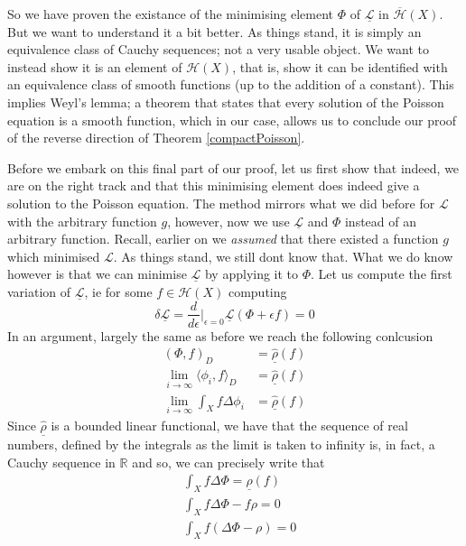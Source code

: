 \documentclass[11pt]{report}
\theoremstyle{definition}
\begin{document}
So we have proven the existance of the minimising element $\Phi$ of $\underline{\mathcal{L}}$ in $\overline{\mathcal{H}}(X)$. But we want to understand it a bit better. As things stand, it is simply an equivalence class of Cauchy sequences; not a very usable object. We want to instead show it is an element of $\mathcal{H}(X)$, that is, show it can be identified with an equivalence class of smooth functions (up to the addition of a constant). This implies Weyl's lemma; a theorem that states that every solution of the Poisson equation is a smooth function, which in our case, allows us to conclude our proof of the reverse direction of Theorem \ref{compactPoisson}.

Before we embark on this final part of our proof, let us first show that indeed, we are on the right track and that this minimising element does indeed give a solution to the Poisson equation. The method mirrors what we did before for $\mathcal{L}$ with the arbitrary function $g$, however, now we use $\underline{\mathcal{L}}$ and $\Phi$ instead of an arbitrary function. Recall, earlier on we \emph{assumed} that there existed a function $g$ which minimised $\mathcal{L}$. As things stand, we still dont know that. What we do know however is that we can minimise $\underline{\mathcal{L}}$ by applying it to $\Phi$. Let us compute the first variation of $\underline{\mathcal{L}}$, ie for some $f\in \mathcal{H}(X)$ computing
 \[ \delta\underline{\mathcal{L}} =  \frac{d}{d\epsilon}\biggr\rvert_{\epsilon = 0} \underline{\mathcal{L}}(\Phi + \epsilon f) = 0\]
In an argument, largely the same as before we reach the following conlcusion
\begin{align*}
  (\Phi,f)_D &= \underline{\hat{\rho}}(f) \\
  \lim_{i \rightarrow \infty}\langle \phi_i,f\rangle_D &= \underline{\hat{\rho}}(f) \\
  \lim_{i \rightarrow \infty}\int_X f \Delta \phi_i &= \underline{\hat{\rho}}(f) 
\end{align*}
Since $\underline{\hat{\rho}}$ is a bounded linear functional, we have that the sequence of real numbers, defined by the integrals as the limit is taken to infinity is, in fact, a Cauchy sequence in $\mathbb{R}$ and so, we can precisely write that 
\begin{align*} 
  &\int_X f\Delta\Phi = \underline{\hat{\rho}}(f) \\
  &\int_X f\Delta\Phi - f\rho = 0 \\
  &\int_X f(\Delta\Phi - \rho) = 0
\end{align*}
\end{document}
